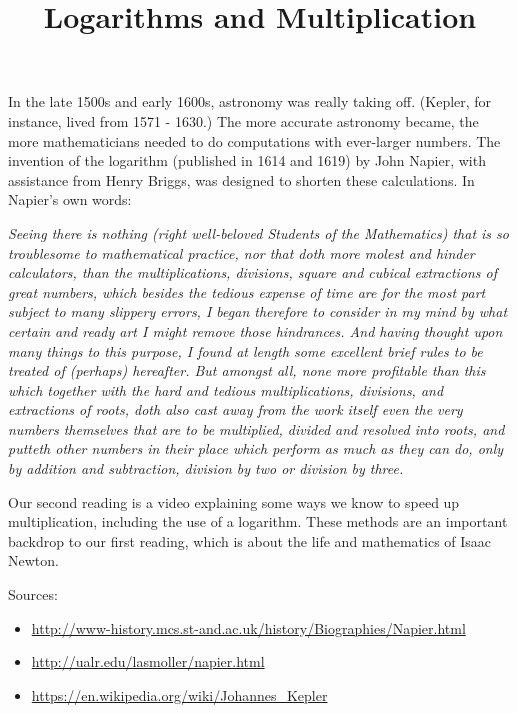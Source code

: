 \documentclass[nooutcomes]{ximera}
\title{Logarithms and Multiplication}
\begin{document}
\begin{abstract}
    
\end{abstract}
\maketitle

In the late 1500s and early 1600s, astronomy was really taking off.  (Kepler, for instance, lived from 1571 - 1630.)  The more accurate astronomy became, the more mathematicians needed to do computations with ever-larger numbers.  The invention of the logarithm (published in 1614 and 1619) by John Napier, with assistance from Henry Briggs, was designed to shorten these calculations.  In Napier's own words: 

{\em Seeing there is nothing (right well-beloved Students of the Mathematics) that is so troublesome to mathematical practice, nor that doth more molest and hinder calculators, than the multiplications, divisions, square and cubical extractions of great numbers, which besides the tedious expense of time are for the most part subject to many slippery errors, I began therefore to consider in my mind by what certain and ready art I might remove those hindrances. And having thought upon many things to this purpose, I found at length some excellent brief rules to be treated of (perhaps) hereafter. But amongst all, none more profitable than this which together with the hard and tedious multiplications, divisions, and extractions of roots, doth also cast away from the work itself even the very numbers themselves that are to be multiplied, divided and resolved into roots, and putteth other numbers in their place which perform as much as they can do, only by addition and subtraction, division by two or division by three.}

Our second reading is a video explaining some ways we know to speed up multiplication, including the use of a logarithm.  These methods are an important backdrop to our first reading, which is about the life and mathematics of Isaac Newton.

Sources:
\begin{itemize}
\item \url{http://www-history.mcs.st-and.ac.uk/history/Biographies/Napier.html}
\item \url{http://ualr.edu/lasmoller/napier.html}
\item \url{https://en.wikipedia.org/wiki/Johannes_Kepler}
\end{itemize}
\end{document}
